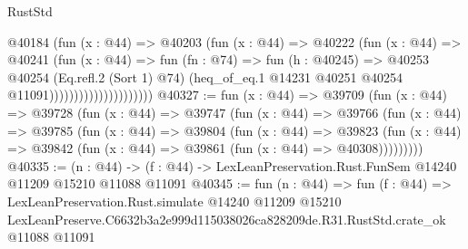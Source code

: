 \begin{lexlean}{RustStd}
\begin{coremodule}
                                  @40184
                                    (fun (x : @44) =>
                                    @40203
                                      (fun (x : @44) =>
                                      @40222
                                        (fun (x : @44) =>
                                        @40241
                                          (fun (x : @44) =>
                                          fun (fn : @74) =>
                                          fun (h : @40245) =>
                                          @40253
                                            @40254
                                            (Eq.refl.{2} (Sort 1) @74)
                                            (heq_of_eq.{1}
                                              @14231
                                              @40251
                                              @40254
                                              @11091)))))))))))))))))))))
@40327 := fun (x : @44) =>
  @39709
    (fun (x : @44) =>
    @39728
      (fun (x : @44) =>
      @39747
        (fun (x : @44) =>
        @39766
          (fun (x : @44) =>
          @39785
            (fun (x : @44) =>
            @39804
              (fun (x : @44) =>
              @39823
                (fun (x : @44) => @39842 (fun (x : @44) => @39861 (fun (x : @44) => @40308)))))))))
@40335 := (n : @44) ->
  (f : @44) -> LexLeanPreservation.Rust.FunSem @14240 @11209 @15210 @11088 @11091
@40345 := fun (n : @44) =>
  fun (f : @44) =>
  LexLeanPreservation.Rust.simulate
    @14240
    @11209
    @15210
    LexLeanPreserve.C6632b3a2e999d115038026ca828209de.R31.RustStd.crate_ok
    @11088
    @11091
\end{coremodule}
\end{lexlean}
